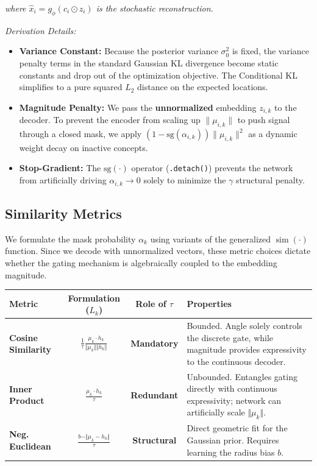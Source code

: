 \documentclass[11pt, a4paper]{article}
\begin{document}
\noindent \textit{where $\hat{x}_i = g_\phi(c_i \odot z_i)$ is the stochastic reconstruction.}

\vspace{0.3cm}
\noindent \textit{Derivation Details:}
\begin{itemize}
    \item \textbf{Variance Constant:} Because the posterior variance $\sigma_0^2$ is fixed, the variance penalty terms in the standard Gaussian KL divergence become static constants and drop out of the optimization objective. The Conditional KL simplifies to a pure squared $L_2$ distance on the expected locations.
    \item \textbf{Magnitude Penalty:} We pass the \textbf{unnormalized} embedding $z_{i,k}$ to the decoder. To prevent the encoder from scaling up $\|\mu_{i,k}\|$ to push signal through a closed mask, we apply $(1 - \text{sg}(\alpha_{i,k})) \|\mu_{i,k}\|^2$ as a dynamic weight decay on inactive concepts.
    \item \textbf{Stop-Gradient:} The $\text{sg}(\cdot)$ operator (\texttt{.detach()}) prevents the network from artificially driving $\alpha_{i,k} \to 0$ solely to minimize the $\gamma$ structural penalty.
\end{itemize}

\subsection{Similarity Metrics}

We formulate the mask probability $\alpha_k$ using variants of the generalized $\operatorname{sim}(\cdot)$ function. Since we decode with unnormalized vectors, these metric choices dictate whether the gating mechanism is algebraically coupled to the embedding magnitude.

\begin{table}[h]
\centering
\renewcommand{\arraystretch}{1.5}
\begin{tabular}{>{\bfseries}l c c p{6cm}}
\toprule
Metric & Formulation ($L_k$) & Role of $\tau$ & Properties \\
\midrule
Cosine Similarity & $\frac{1}{\tau} \frac{\mu_k \cdot h_k}{\Vert \mu_k \Vert \Vert h_k \Vert}$ & \textbf{Mandatory} & Bounded. Angle solely controls the discrete gate, while magnitude provides expressivity to the continuous decoder. \\
Inner Product & $\frac{\mu_k \cdot h_k}{\tau}$ & \textbf{Redundant} & Unbounded. Entangles gating directly with continuous expressivity; network can artificially scale $\Vert \mu_k \Vert$. \\
Neg. Euclidean & $\frac{b - \Vert \mu_k - h_k \Vert}{\tau}$ & \textbf{Structural} & Direct geometric fit for the Gaussian prior. Requires learning the radius bias $b$. \\
\bottomrule
\end{tabular}
\end{table}
\end{document}
